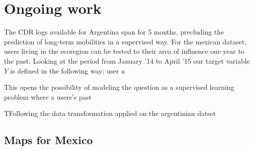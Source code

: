 \section{Ongoing work}

The CDR logs available for Argentina span for 5 months, precluding the prediction of long-term mobilities in a supervised way. For the mexican dataset, users living in the ecoregion can be tested to their area of influence one year to the past. Looking at the period from January '14 to April '15 our target variable $Y $ is defined in the following way: 
\equation{}
user $u$ 

This opens the possibility of modeling the question as a supervised learning problem where a users's past 

TFollowing the data transformation applied on the argentinian datset

\subsection{Maps for Mexico}